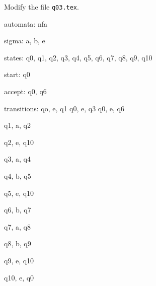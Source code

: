Modify the file \verb!q03.tex!.

\begin{console}
automata: nfa

sigma: a, b, e

states: q0, q1, q2, q3, q4, q5, q6, q7, q8, q9, q10

start: q0

accept: q0, q6

transitions:
qo, e, q1
q0, e, q3
q0, e, q6

q1, a, q2

q2, e, q10

q3, a, q4

q4, b, q5

q5, e, q10

q6, b, q7

q7, a, q8

q8, b, q9

q9, e, q10

q10, e, q0
\end{console}
